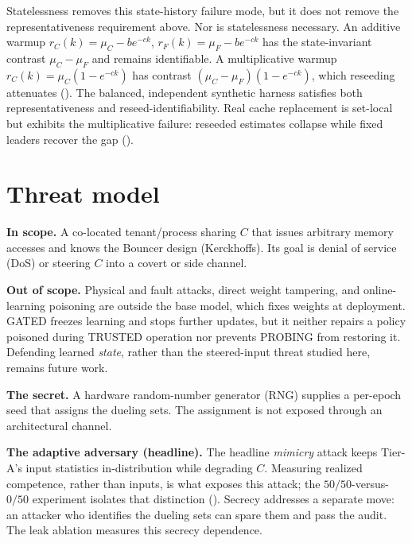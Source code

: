 \documentclass{article}
\begin{document}
Statelessness removes this state-history failure mode, but it does not remove the
representativeness requirement above. Nor is statelessness necessary. An additive
warmup $r_C(k)=\mu_C-b e^{-ck}$, $r_F(k)=\mu_F-b e^{-ck}$ has the state-invariant
contrast $\mu_C-\mu_F$ and remains identifiable. A multiplicative warmup
$r_C(k)=\mu_C(1-e^{-ck})$ has contrast
$(\mu_C-\mu_F)(1-e^{-ck})$, which reseeding attenuates ().
The balanced, independent synthetic harness satisfies both representativeness and
reseed-identifiability. Real cache replacement is set-local but exhibits the
multiplicative failure: reseeded estimates collapse while fixed leaders recover the
gap ().

\section{Threat model}\label{sec:threat}
\textbf{In scope.} A co-located tenant/process sharing $C$ that issues arbitrary
memory accesses and knows the Bouncer design (Kerckhoffs). Its goal is denial of
service (DoS) or steering $C$ into a covert or side channel.

\textbf{Out of scope.} Physical and fault attacks, direct weight tampering, and
online-learning poisoning are outside the base model, which fixes weights at
deployment. GATED freezes learning and stops further updates, but it neither
repairs a policy poisoned during TRUSTED operation nor prevents PROBING from
restoring it. Defending learned \emph{state}, rather than the steered-input threat
studied here, remains future work.

\textbf{The secret.} A hardware random-number generator (RNG) supplies a
per-epoch seed that assigns the dueling sets. The assignment is not exposed
through an architectural channel.

\textbf{The adaptive adversary (headline).} The headline \emph{mimicry} attack
keeps Tier-A's input statistics in-distribution while degrading $C$. Measuring
realized competence, rather than inputs, is what exposes this attack; the
$50/50$-versus-$0/50$ experiment isolates that distinction ().
Secrecy addresses a separate move: an attacker who identifies the dueling sets can
spare them and pass the audit. The leak ablation measures this secrecy dependence.
\end{document}

